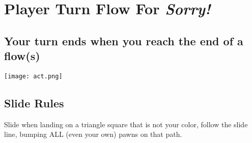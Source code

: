 \documentclass[letterpaper]{article}
\begin{document}
\section*{Player Turn Flow For \textit{Sorry!}}
\subsection*{Your turn ends when you reach the end of a flow(s)}
\texttt{[image: act.png]}

\subsection*{Slide Rules}
Slide when landing on a triangle square that is not your color,
follow the slide line, bumping ALL (even your own) pawns on that path.
\end{document}

